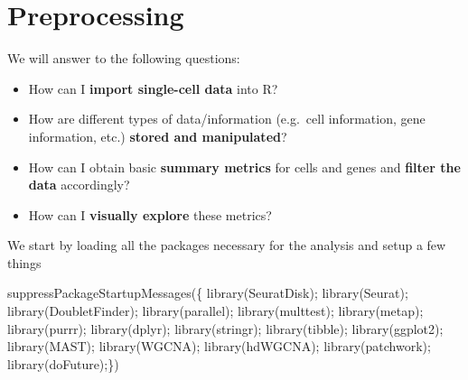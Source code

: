 \documentclass[
  letterpaper,
  DIV=11,
  numbers=noendperiod]{scrartcl}
\newenvironment{Shaded}{}{}
\newcommand{\FunctionTok}[1]{\textcolor[rgb]{0.02,0.16,0.49}{#1}}
\newcommand{\NormalTok}[1]{#1}
\providecommand{\tightlist}{%
  \setlength{\itemsep}{0pt}\setlength{\parskip}{0pt}}\usepackage{longtable,booktabs,array}
\begin{document}
\section{Preprocessing}\label{sec-preprocessing}

\begin{tcolorbox}[enhanced jigsaw, arc=.35mm, opacityback=0, coltitle=black, toprule=.15mm, opacitybacktitle=0.6, titlerule=0mm, colbacktitle=quarto-callout-note-color!10!white, left=2mm, breakable, bottomtitle=1mm, title=\textcolor{quarto-callout-note-color}{\faInfo}\hspace{0.5em}{Learning outcome}, toptitle=1mm, colframe=quarto-callout-note-color-frame, leftrule=.75mm, rightrule=.15mm, bottomrule=.15mm, colback=white]

We will answer to the following questions:

\begin{itemize}
\tightlist
\item
  How can I \textbf{import single-cell data} into R?
\item
  How are different types of data/information (e.g.~cell information,
  gene information, etc.) \textbf{stored and manipulated}?
\item
  How can I obtain basic \textbf{summary metrics} for cells and genes
  and \textbf{filter the data} accordingly?
\item
  How can I \textbf{visually explore} these metrics?
\end{itemize}

\end{tcolorbox}

We start by loading all the packages necessary for the analysis and
setup a few things

\begin{Shaded}
\begin{Highlighting}[]
\FunctionTok{suppressPackageStartupMessages}\NormalTok{(\{}
\FunctionTok{library}\NormalTok{(SeuratDisk); }
\FunctionTok{library}\NormalTok{(Seurat);}
\FunctionTok{library}\NormalTok{(DoubletFinder);}
\FunctionTok{library}\NormalTok{(parallel);}
\FunctionTok{library}\NormalTok{(multtest);}
\FunctionTok{library}\NormalTok{(metap);}
\FunctionTok{library}\NormalTok{(purrr);}
\FunctionTok{library}\NormalTok{(dplyr);}
\FunctionTok{library}\NormalTok{(stringr);}
\FunctionTok{library}\NormalTok{(tibble);}
\FunctionTok{library}\NormalTok{(ggplot2);}
\FunctionTok{library}\NormalTok{(MAST);}
\FunctionTok{library}\NormalTok{(WGCNA);}
\FunctionTok{library}\NormalTok{(hdWGCNA);}
\FunctionTok{library}\NormalTok{(patchwork);}
\FunctionTok{library}\NormalTok{(doFuture);\})}
\end{Highlighting}
\end{Shaded}
\end{document}
